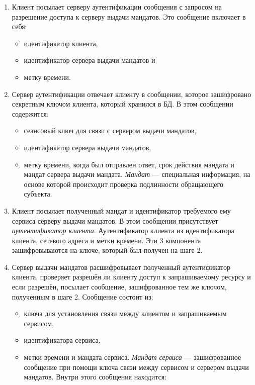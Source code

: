 \documentclass[12pt, russian, oneside, article]{ncc}
\begin{document}
\begin{enumerate}
\item Клиент посылает серверу аутентификации сообщения с запросом на разрешение доступа к серверу выдачи мандатов. Это сообщение включает в себя:

\begin{itemize}
\item идентификатор клиента,
\item идентификатор сервера выдачи мандатов и
\item метку времени.
\end{itemize}

\item Сервер аутентификации отвечает клиенту в сообщении, которое зашифровано секретным ключом клиента, который хранился в БД. В этом сообщении содержится:

\begin{itemize}
\item сеансовый ключ для связи с сервером выдачи мандатов,
\item идентификатор сервера выдачи мандатов,
\item метку времени, когда был отправлен ответ, срок действия мандата и мандат сервера выдачи мандата. \emph{Мандат} --- специальная информация, на основе которой происходит проверка подлинности обращающего субъекта.
\end{itemize}

\item Клиент посылает полученный мандат и идентификатор требуемого ему сервиса серверу выдачи мандатов. В этом сообщении присутствует \emph{аутентификатор клиента}. Аутентификатор клиента из идентификатора клиента, сетевого адреса и метки времени. Эти 3 компонента зашифровываются на ключе, который был получен на шаге 2.
\item Сервер выдачи мандатов расшифровывает полученный аутентификатор клиента, проверяет разрешён ли клиенту доступ к запрашиваемому ресурсу и если разрешён, посылает сообщение, зашифрованное тем же ключом, полученным в шаге 2. Сообщение состоит из:

\begin{itemize}
\item ключа для установления связи между клиентом и запрашиваемым сервисом,
\item идентификатора сервиса,
\item метки времени и мандата сервиса. \emph{Мандат сервиса} --- зашифрованное сообщение при помощи ключа связи между сервисом и сервером выдачи мандатов. Внутри этого сообщения находится:


\end{itemize}
\end{enumerate}
\end{document}
